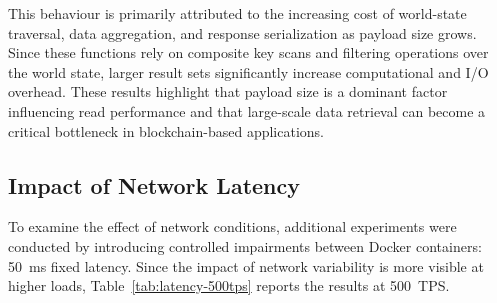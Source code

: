 \documentclass[manuscript,screen]{acmart}
\begin{document}
This behaviour is primarily attributed to the increasing cost of world-state traversal, data aggregation, and response serialization as payload size grows. Since these functions rely on composite key scans and filtering operations over the world state, larger result sets significantly increase computational and I/O overhead. These results highlight that payload size is a dominant factor influencing read performance and that large-scale data retrieval can become a critical bottleneck in blockchain-based applications.

\begin{table}[h]
	\centering
	\caption{Performance Results for Retrieval Functions at 100 TPS under Varying Payload Sizes}
	\label{tab:retrieval-combined}
\end{table}
\subsection{Impact of Network Latency}

To examine the effect of network conditions, additional experiments were conducted by introducing controlled impairments between Docker containers: 50~ms fixed latency. Since the impact of network variability is more visible at higher loads, Table~\ref{tab:latency-500tps} reports the results at 500~TPS.
\end{document}
